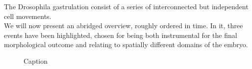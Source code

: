 The Drosophila gastrulation consist of a series of interconnected but independent cell movements. \\
We will now present an abridged overview, roughly ordered in time. In it, three events have been highlighted, chosen for being both instrumental for the final morphological outcome and relating to spatially different domains of the embryo. 



\newpage

\begin{figure}[H]
    \centering
    \vspace*{-1cm}
    \caption{Caption}
    \label{fig:big-timeline}
\end{figure}
\newpage
\addtocounter{figure}{-1}
